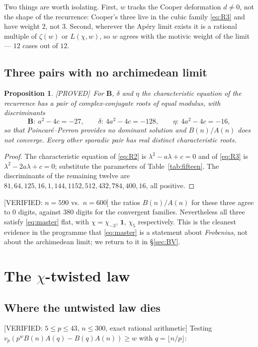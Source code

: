 \documentclass[11pt,reqno]{amsart}
\theoremstyle{plain}
\newtheorem{proposition}[theorem]{Proposition}
\theoremstyle{definition}
\theoremstyle{remark}
\newcommand{\vp}{v_p}
\newcommand{\Proved}{\textup{\textsf{[PROVED]}}}
\newcommand{\VerifiedR}[1]{\textup{\textsf{[VERIFIED: #1]}}}
\numberwithin{equation}{section}
\begin{document}
Two things are worth isolating. First, $w$ tracks the Cooper deformation $d\ne0$, not the
shape of the recurrence: Cooper's three live in the cubic family \eqref{eq:R3} and have
weight $2$, not $3$. Second, wherever the Ap\'ery limit exists it is a rational multiple of
$\zeta(w)$ or $L(\chi,w)$, so $w$ agrees with the motivic weight of the limit --- $12$
cases out of $12$.

\subsection{Three pairs with no archimedean limit}\label{sec:nolimit}
\begin{proposition}\label{prop:nolimit}
\Proved\ For $\mathbf B$, $\delta$ and $\eta$ the characteristic equation of the recurrence
has a pair of complex-conjugate roots of equal modulus, with discriminants
\[
  \mathbf B:\ a^2-4c=-27,\qquad
  \delta:\ 4a^2-4c=-128,\qquad
  \eta:\ 4a^2-4c=-16 ,
\]
so that Poincar\'e--Perron provides no dominant solution and $B(n)/A(n)$ does not converge.
Every other sporadic pair has real distinct characteristic roots.
\end{proposition}

\begin{proof}
The characteristic equation of \eqref{eq:R2} is $\lambda^2-a\lambda+c=0$ and of
\eqref{eq:R3} is $\lambda^2-2a\lambda+c=0$; substitute the parameters of
Table~\ref{tab:fifteen}. The discriminants of the remaining twelve are
$81,64,125,16,1,144,1152,512,432,784,400,16$, all positive.
\end{proof}

\VerifiedR{$n=590$ vs.\ $n=600$} the ratios $B(n)/A(n)$ for these three agree to $0$ digits,
against $380$ digits for the convergent families. Nevertheless all three satisfy
\eqref{eq:master} flat, with $\chi=\chi_{-3}$, $\mathbf 1$, $\chi_5$ respectively. This is
the cleanest evidence in the programme that \eqref{eq:master} is a statement about
\emph{Frobenius}, not about the archimedean limit; we return to it in \S\ref{sec:BV}.

\section{The $\chi$-twisted law}\label{sec:law}

\subsection{Where the untwisted law dies}
\VerifiedR{$5\le p\le43$, $n\le300$, exact rational arithmetic}
Testing $\vp(p^wB(n)A(q)-B(q)A(n))\ge w$ with $q=\lfloor n/p\rfloor$:
\end{document}
